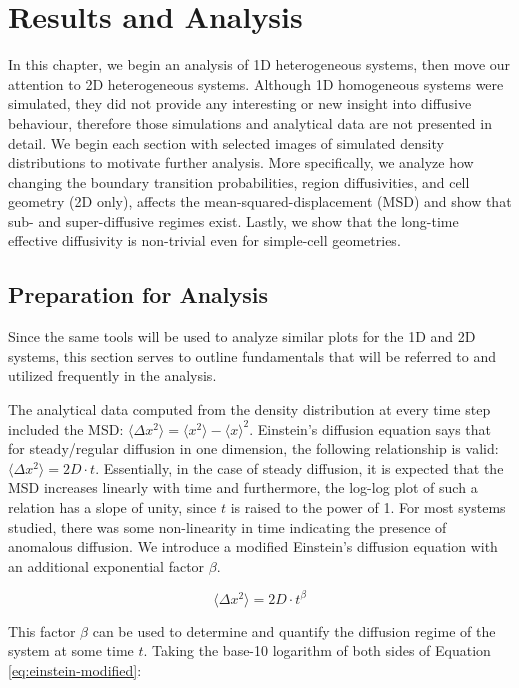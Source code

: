 \chapter{Results and Analysis}
\label{chapter:results-analysis}
	
	In this chapter, we begin an analysis of 1D heterogeneous systems, then move our attention to 2D heterogeneous systems. Although 1D homogeneous systems were simulated, they did not provide any interesting or new insight into diffusive behaviour, therefore those simulations and analytical data are not presented in detail. We begin each section with selected images of simulated density distributions to motivate further analysis. More specifically, we analyze how changing the boundary transition probabilities, region diffusivities, and cell geometry (2D only), affects the mean-squared-displacement (MSD) and show that sub- and super-diffusive regimes exist. Lastly, we show that the long-time effective diffusivity is non-trivial even for simple-cell geometries.
	
\section{Preparation for Analysis}
	Since the same tools will be used to analyze similar plots for the 1D and 2D systems, this section serves to outline fundamentals that will be referred to and utilized frequently in the analysis.
	
	The analytical data computed from the density distribution at every time step included the MSD: $ \langle \Delta x^2 \rangle = \langle x^2 \rangle - \langle x \rangle^2 $. Einstein's diffusion equation says that for steady/regular diffusion in one dimension, the following relationship is valid: $ \langle \Delta x^2 \rangle = 2D \cdot t $. Essentially, in the case of steady diffusion, it is expected that the MSD increases linearly with time and furthermore, the log-log plot of such a relation has a slope of unity, since $ t $ is raised to the power of 1. For most systems studied, there was some non-linearity in time indicating the presence of anomalous diffusion. We introduce a modified Einstein's diffusion equation with an additional exponential factor $ \beta $.
	
	\begin{equation}
	\label{eq:einstein-modified}
		\langle \Delta x^2 \rangle = 2D \cdot t^{\beta}
	\end{equation}
	
	This factor $ \beta $ can be used to determine and quantify the diffusion regime of the system at some time $ t $. Taking the base-10 logarithm of both sides of Equation \ref{eq:einstein-modified}:

